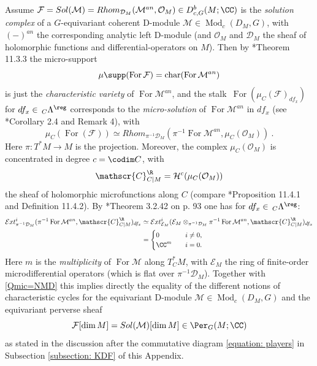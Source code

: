\documentclass[11pt,letterpaper]{amsart}
\numberwithin{equation}{section}
\begin{document}
\begin{remark} \label{micro-solution}
Assume $\mathcal{F}=Sol(\mathcal{M})=Rhom_{\mathcal{D}_M}(\mathcal{M}^{an},\mathcal{O}_M)\in D^b_{c,G}(M;\CC)$ 
is the {\it solution complex} of a $G$-equivariant coherent D-module $\mathcal{M}\in \operatorname{Mod}_{c}(D_M,G)$,
with $(-)^{an}$ the corresponding analytic left D-module (and $\mathcal{O}_M$ and $\mathcal{D}_M$ the sheaf of holomorphic functions and differential-operators on $M$).
Then by \cite{KaS94}*{Theorem 11.3.3} the micro-support
$$\mu \supp(\operatorname{For}\mathcal{F}) = \mathrm{char}(\operatorname{For}\mathcal{M}^{an})$$
is just the {\it characteristic variety} of $\operatorname{For}\mathcal{M}^{an}$, and
the stalk $\,\operatorname{For}(\mu_C (\mathcal{F})_{df_x})$ for $df_x\in \,_C\Lambda^\reg$
corresponds to the {\it micro-solution} of $\operatorname{For}\mathcal{M}^{an}$ in $df_x$ (see \cite{MF95}*{Corollary 2.4 and Remark 4}), with
$$\mu_C(\operatorname{For}(\mathcal{F})) \simeq Rhom_{\pi^{-1}\mathcal{D}_M}(\pi^{-1}\operatorname{For}\mathcal{M}^{an},\mu_C(\mathcal{O}_M))\:.$$
Here $\pi: T^*M\to M$ is the projection. Moreover, the complex $\mu_C(\mathcal{O}_M)$
is concentrated in degree $c=\codim C$, with
$$\mathscr{C}^\R_{C|M}=\mathcal{H}^c(\mu_C(\mathcal{O}_M))$$
the sheaf of holomorphic microfunctions along $C$ (compare  \cite{KaS94}*{Proposition 11.4.1 and
Definition 11.4.2}).
By \cite{Kas83}*{Theorem 3.2.42 on p. 93} one has for $df_x\in \,_C\Lambda^\reg$:
\begin{equation*}\begin{split}\mathcal{E}xt^i_{\pi^{-1}\mathcal{D}_M}(\pi^{-1}\operatorname{For}\mathcal{M}^{an},\mathscr{C}^\R_{C|M})_{df_x}
&\simeq \mathcal{E}xt^i_{\mathcal{E}_M}(\mathcal{E}_M \otimes_{\pi^{-1}\mathcal{D}_M} \pi^{-1}\operatorname{For}\mathcal{M}^{an},\mathscr{C}^\R_{C|M})_{df_x}\\
&=\begin{cases}
0 \quad &i\neq 0,\\
\CC^m \quad &i=0.
\end{cases}\end{split}\end{equation*}
Here $m$ is the {\it multiplicity} of $\operatorname{For}\mathcal{M}$ along  $T^*_CM$, with $\mathcal{E}_M$ the ring of finite-order microdifferential operators (which is flat over $\pi^{-1}\mathcal{D}_M$). Together with \eqref{Qmic=NMD} this implies directly the equality of the different notions of characteristic cycles for the equivariant D-module $\mathcal{M}\in \operatorname{Mod}_{c}(D_M,G)$ and the equivariant perverse sheaf
$$\mathcal{F}[\dim M]=Sol(\mathcal{M})[\dim M]\in \Per_{G}(M;\CC)$$ 
as stated in the discussion after the commutative diagram \eqref{equation: players} in Subsection \ref{subsection: KDF}  of this Appendix.
\end{remark}
\end{document}
